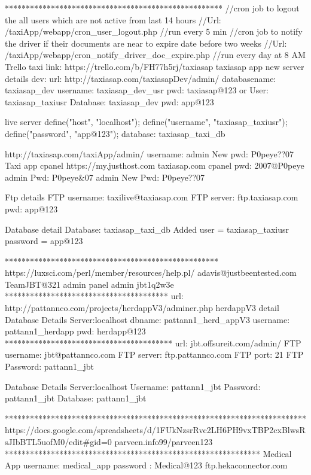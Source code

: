 ****************************************************
//cron job to logout the all users which are not active from last 14 hours
//Url: /taxiApp/webapp/cron_user_logout.php //run every 5 min
//cron job to notify the driver if their documents are near to expire date before two weeks
//Url: /taxiApp/webapp/cron_notify_driver_doc_expire.php //run every day at 8 AM
Trello taxi link: https://trello.com/b/FH77h5rj/taxiasap
taxiasap app new server details dev:
url: http://taxiasap.com/taxiasapDev/admin/
databasename: taxiasap_dev 
username: taxiasap_dev_usr
pwd: taxiasap@123
or
User: taxiasap_taxiusr
Database: taxiasap_dev 
pwd: app@123

live server
	define("host", "localhost");
	define("username", "taxiasap_taxiusr");
	define("password", "app@123");
	database: taxiasap_taxi_db

http://taxiasap.com/taxiApp/admin/
username: admin
New pwd: P0peye??07
Taxi app cpanel
https://my.justhost.com
taxiasap.com
cpanel pwd: 2007@P0peye
admin Pwd: P0peye&07
admin New Pwd: P0peye??07

Ftp details
FTP username: taxilive@taxiasap.com
FTP server: ftp.taxiasap.com
pwd: app@123

Database detail
Database: taxiasap_taxi_db
Added user = taxiasap_taxiusr
password = app@123



***************************************************
https://luxsci.com/perl/member/resources/help.pl/
adavis@justbeentested.com
TeamJBT@321
admin panel
admin
jbt1q2w3e
***************************************
url: http://pattannco.com/projects/herdappV3/adminer.php
herdappV3 detail
Database Details
Server:localhost
dbname:  pattann1_herd_appV3
username: pattann1_herdapp
pwd: herdapp@123
****************************************
url: jbt.offsureit.com/admin/
FTP username: jbt@pattannco.com
FTP server: ftp.pattannco.com
FTP port: 21
FTP Password: pattann1_jbt


Database Details
Server:localhost
Username: pattann1_jbt
Password: pattann1_jbt
Database: pattann1_jbt

************************************************************************
https://docs.google.com/spreadsheets/d/1FUkNzsrRvc2LH6PH9vxTBP2cxBlwsRsJIbBTL5uofM0/edit#gid=0
parveen.info99/parveen123
*************************************************************
Medical App
username: medical_app
password : Medical@123 
ftp.hekaconnector.com

